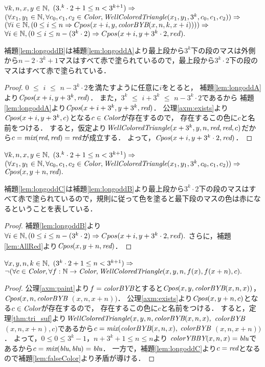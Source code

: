 \begin{lem}[\LongOddB] \label{lem:longoddB}
  $\forall k,n,x,y \in \mathbb{N},$
  $(3.^k\cdot2 + 1 \leq n < 3^{k+1}) \Rightarrow$
  $(\forall x_1,y_1 \in \mathbb{N}, \forall c_0,c_1,c_2 \in \textit{Color}, \textit{WellColoredTriangle}(x_1,y_1,3^k,c_0,c_1,c_2)) \Rightarrow$
  $(\forall i \in \mathbb{N},(0 \leq i \leq n \Rightarrow Cpos(x+i,y,\textit{colorBYB}(x,n,k,x+i)))) \Rightarrow$ 
  $\forall i \in \mathbb{N}, (0 \leq i \leq n-(3^k\cdot2) \Rightarrow Cpos(x+i,y+3^k\cdot2,red).$
\end{lem}
補題\ref{lem:longoddB}は補題\ref{lem:longoddA}より最上段から$3^k$下の段のマスは外側から$n-2\cdot3^k+1$マスはすべて赤で塗られているので，最上段から$3^k\cdot2$下の段のマスはすべて赤で塗られている．
\begin{proof}
  $0$ $\leq$ $i$ $\leq$ $n - 3^k \cdot 2$を満たすように任意に$i$をとると，
  補題\ref{lem:longoddA}より$\textit{Cpos}(x+i,y+3^k,\textit{red})$．
  また，$3^k$ $\leq$ $i+3^k$ $\leq$ $n - 3^k \cdot 2$であるから
  補題\ref{lem:longoddA}より$\textit{Cpos}(x+i+3^k,y+3^k,\textit{red})$．
  公理\ref{axm:exists}より$\textit{Cpos}(x+i,y+3^k,c)$となる$c\in\textit{Color}$が存在するので，
  存在するこの色に$c$と名前をつける．
  すると，仮定より$\textit{WellColoredTriangle}(x+3^k,y,n,\textit{red},\textit{red},c)$だから$c=\textit{mix}(\textit{red},\textit{red})=\textit{red}$が成立する．
  よって，$\textit{Cpos}(x+i,y+3^k\cdot2,\textit{red})$．
\end{proof}


\begin{lem}[\LongOddC] \label{lem:longoddC}
  $\forall k,n,x,y \in \mathbb{N},$
  $(3.^k\cdot2 + 1 \leq n < 3^{k+1}) \Rightarrow$
  $(\forall x_1,y_1 \in \mathbb{N}, \forall c_0,c_1,c_2 \in \textit{Color}, \textit{WellColoredTriangle}(x_1,y_1,3^k,c_0,c_1,c_2)) \Rightarrow$
  $\textit{Cpos}(x,y+n,\textit{red}).$
\end{lem}
補題\ref{lem:longoddC}は補題\ref{lem:longoddB}より最上段から$3^k\cdot2$下の段のマスはすべて赤で塗られているので，規則に従って色を塗ると最下段のマスの色は赤になるということを表している．
\begin{proof}
  補題\ref{lem:longoddB}より$\forall i \in \mathbb{N}, (0 \leq i \leq n-(3^k\cdot2) \Rightarrow Cpos(x+i,y+3^k\cdot2,red).$
  さらに，補題\ref{lem:AllRed}より$\textit{Cpos}(x,y+n,\textit{red})$．
\end{proof}
\begin{lem}[\LongOdd] \label{lem:longodd}
  $\forall x,y,n,k \in \mathbb{N},$
  $(3^k\cdot2 + 1 \leq n < 3^{k+1}) \Rightarrow$
  $\lnot(\forall c \in \textit{Color}, \forall f:\mathbb{N} \to \textit{Color}, \textit{WellColoredTriangle}(x,y,n,f(x),f(x+n), c).$
\end{lem}
\begin{proof}
  公理\ref{axm:paint}より$f=\textit{colorBYB}$とすると$\textit{Cpos}(x,y,\textit{colorBYB}(x,n,x))$，$\textit{Cpos}(x,n,\textit{colorBYB}$ $(x,n,x+n))$．
  公理\ref{axm:exists}より$\textit{Cpos}(x,y+n,c)$となる$c\in\textit{Color}$が存在するので，
  存在するこの色に$c$と名前をつける．
  すると，定理\ref{thm:tri_suf}より$\textit{WellColoredTriangle}(x,y,n,\textit{colorBYB}(x,n,x),$ $\textit{colorBYB}$ $(x,n,x+n),c)$であるから$c=\textit{mix}(\textit{colorBYB}(x,n,x),$ $\textit{colorBYB}$ $(x,n,x+n))$．
  よって，$0 \leq 0 \leq 3^k-1$，$n+3^k+1 \leq n \leq n$より
  $\textit{colorYBBY}(x,n,x)=\textit{blu}$であるから$c=\textit{mix}(\textit{blu},\textit{blu})=\textit{blu}$．
  一方で，補題\ref{lem:longoddC}より$c=\textit{red}$となるので補題\ref{lem:falseColor}より矛盾が導ける．
\end{proof}

